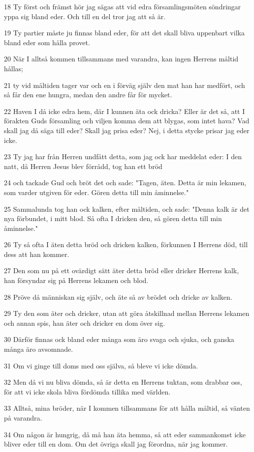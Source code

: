 \par 18 Ty först och främst hör jag sägas att vid edra församlingsmöten söndringar yppa sig bland eder. Och till en del tror jag att så är.
\par 19 Ty partier måste ju finnas bland eder, för att det skall bliva uppenbart vilka bland eder som hålla provet.
\par 20 När I alltså kommen tillsammans med varandra, kan ingen Herrens måltid hållas;
\par 21 ty vid måltiden tager var och en i förväg själv den mat han har medfört, och så får den ene hungra, medan den andre får för mycket.
\par 22 Haven I då icke edra hem, där I kunnen äta ock dricka? Eller är det så, att I förakten Guds församling och viljen komma dem att blygas, som intet hava? Vad skall jag då säga till eder? Skall jag prisa eder? Nej, i detta stycke prisar jag eder icke.
\par 23 Ty jag har från Herren undfått detta, som jag ock har meddelat eder: I den natt, då Herren Jesus blev förrådd, tog han ett bröd
\par 24 och tackade Gud och bröt det och sade: "Tagen, äten. Detta är min lekamen, som varder utgiven för eder. Gören detta till min åminnelse."
\par 25 Sammalunda tog han ock kalken, efter måltiden, och sade: "Denna kalk är det nya förbundet, i mitt blod. Så ofta I dricken den, så gören detta till min åminnelse."
\par 26 Ty så ofta I äten detta bröd och dricken kalken, förkunnen I Herrens död, till dess att han kommer.
\par 27 Den som nu på ett ovärdigt sätt äter detta bröd eller dricker Herrens kalk, han försyndar sig på Herrens lekamen och blod.
\par 28 Pröve då människan sig själv, och äte så av brödet och dricke av kalken.
\par 29 Ty den som äter och dricker, utan att göra åtskillnad mellan Herrens lekamen och annan spis, han äter och dricker en dom över sig.
\par 30 Därför finnas ock bland eder många som äro svaga och sjuka, och ganska många äro avsomnade.
\par 31 Om vi ginge till doms med oss själva, så bleve vi icke dömda.
\par 32 Men då vi nu bliva dömda, så är detta en Herrens tuktan, som drabbar oss, för att vi icke skola bliva fördömda tillika med världen.
\par 33 Alltså, mina bröder, när I kommen tillsammans för att hålla måltid, så vänten på varandra.
\par 34 Om någon är hungrig, då må han äta hemma, så att eder sammankomst icke bliver eder till en dom. Om det övriga skall jag förordna, när jag kommer.

